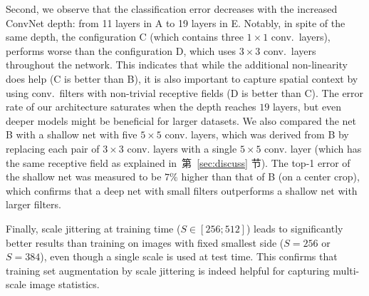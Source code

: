 \documentclass{article} %
\newcommand{\sref}[1]{第~\ref{#1} 节}
\begin{document}
Second, we observe that the classification error decreases with the increased ConvNet depth: from 11 layers in A to 19 layers in E.
Notably, in spite of the same depth, the configuration C (which contains three $1 \times 1$ conv.\ layers), performs worse than
the configuration D, which uses $3 \times 3$ conv.\ layers throughout the network.
This indicates that while the additional non-linearity does help (C is better than B), it is also important to capture spatial context by using conv.\ filters with non-trivial receptive fields (D is better than C). 
The error rate of our architecture saturates when the depth reaches $19$ layers, but even deeper models might be beneficial for larger datasets.
We also compared the net B with a shallow net with five $5\times5$ conv. layers, which was derived from B by replacing 
each pair of $3\times3$ conv. layers with a single $5\times5$ conv. layer (which has the same receptive field as explained in~\sref{sec:discuss}).
The top-1 error of the shallow net was measured to be $7\%$ higher than that of B (on a center crop), which confirms that a deep net with small 
filters outperforms a shallow net with larger filters. 

Finally, scale jittering at training time ($S \in [256;512]$) leads to significantly better results than training on images with fixed smallest side ($S=256$ or $S=384$),
even though a single scale is used at test time. This confirms that training set augmentation by scale jittering is indeed helpful for capturing multi-scale image statistics.


\end{document}
